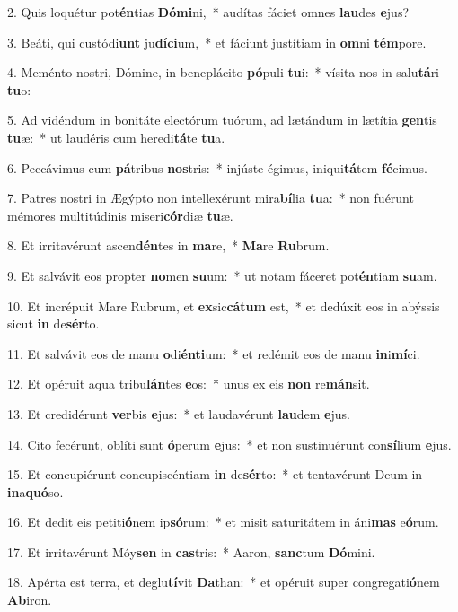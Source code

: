 2. Quis loquétur pot\textbf{én}tias \textbf{Dó}\textbf{mi}ni,~*  audítas fáciet omnes \textbf{lau}des \textbf{e}jus?\

3. Beáti, qui custódi\textbf{unt} ju\textbf{dí}\textbf{ci}um,~*  et fáciunt justítiam in \textbf{om}ni \textbf{tém}pore.\

4. Meménto nostri, Dómine, in beneplácito \textbf{pó}puli \textbf{tu}i:~*  vísita nos in salu\textbf{tá}ri \textbf{tu}o:\

5. Ad vidéndum in bonitáte electórum tuórum, ad lætándum in lætítia \textbf{gen}tis \textbf{tu}æ:~*  ut laudéris cum heredi\textbf{tá}te \textbf{tu}a.\

6. Peccávimus cum \textbf{pá}tribus \textbf{nos}tris:~*  injúste égimus, iniqui\textbf{tá}tem \textbf{fé}cimus.\

7. Patres nostri in Ægýpto non intellexérunt mira\textbf{bí}lia \textbf{tu}a:~*  non fuérunt mémores multitúdinis miseri\textbf{cór}diæ \textbf{tu}æ.\

8. Et irritavérunt ascen\textbf{dén}tes in \textbf{ma}re,~*  \textbf{Ma}re \textbf{Ru}brum.\

9. Et salvávit eos propter \textbf{no}men \textbf{su}um:~*  ut notam fáceret pot\textbf{én}tiam \textbf{su}am.\

10. Et incrépuit Mare Rubrum, et \textbf{ex}sic\textbf{cá}\textbf{tum} est,~*  et dedúxit eos in abýssis sicut \textbf{in} de\textbf{sér}to.\

11. Et salvávit eos de manu \textbf{o}di\textbf{én}\textbf{ti}um:~*  et redémit eos de manu \textbf{in}i\textbf{mí}ci.\

12. Et opéruit aqua tribu\textbf{lán}tes \textbf{e}os:~*  unus ex eis \textbf{non} re\textbf{mán}sit.\

13. Et credidérunt \textbf{ver}bis \textbf{e}jus:~*  et laudavérunt \textbf{lau}dem \textbf{e}jus.\

14. Cito fecérunt, oblíti sunt \textbf{ó}perum \textbf{e}jus:~*  et non sustinuérunt con\textbf{sí}lium \textbf{e}jus.\

15. Et concupiérunt concupiscéntiam \textbf{in} de\textbf{sér}to:~*  et tentavérunt Deum in \textbf{in}a\textbf{quó}so.\

16. Et dedit eis petiti\textbf{ó}nem ip\textbf{só}rum:~*  et misit saturitátem in áni\textbf{mas} e\textbf{ó}rum.\

17. Et irritavérunt Móy\textbf{sen} in \textbf{cas}tris:~*  Aaron, \textbf{sanc}tum \textbf{Dó}mini.\

18. Apérta est terra, et deglu\textbf{tí}vit \textbf{Da}than:~*  et opéruit super congregati\textbf{ó}nem \textbf{Ab}iron.\

